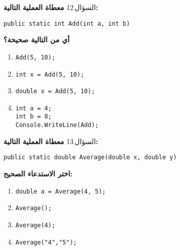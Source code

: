 \documentclass[13pt]{beamer}
\begin{document}
\begin{frame}[fragile]{السؤال\,12}
\textbf{معطاة العملية التالية:}

\begin{english}
\begin{lstlisting}[language=CSharp]
public static int Add(int a, int b)
\end{lstlisting}
\end{english}

\textbf{أي من التالية صحيحة؟}

\begin{english}
\begin{enumerate}[label=(\alph*)]
  \item \texttt{Add(5, 10);}
  \item \texttt{int x = Add(5, 10);}
  \item \texttt{double x = Add(5, 10);}
  \item
  \begin{lstlisting}[language=CSharp]
int a = 4;
int b = 8;
Console.WriteLine(Add);
  \end{lstlisting}
\end{enumerate}
\end{english}
\end{frame}

\begin{frame}[fragile]{السؤال\,13}
\textbf{معطاة العملية التالية:}

\begin{english}
\begin{lstlisting}[language=CSharp]
public static double Average(double x, double y)
\end{lstlisting}
\end{english}

\textbf{اختر الاستدعاء الصحيح:}

\begin{english}
\begin{enumerate}[label=(\alph*)]
  \item \texttt{double a = Average(4, 5);}
  \item \texttt{Average();}
  \item \texttt{Average(4);}
  \item \texttt{Average("4","5");}
\end{enumerate}
\end{english}
\end{frame}
\end{document}
